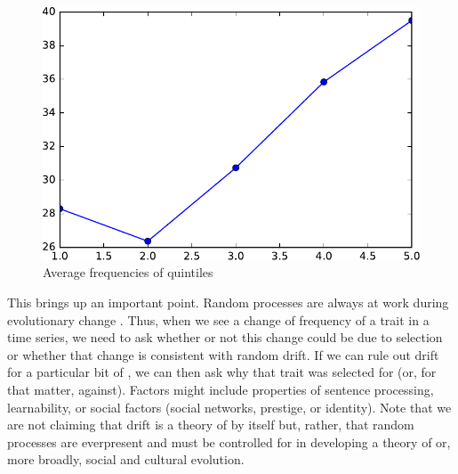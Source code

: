 \documentclass[output=paper]{langsci/langscibook}
\begin{document}
\begin{figure}
  \includegraphics[width=.75\linewidth]{img/smooth_data.pdf}
  \caption{Average frequencies of quintiles\label{smoothed}}
\end{figure}


This brings up an important point.  Random processes are always at
work during evolutionary change \citep{kimura:1983}.  Thus, when we
see a change of frequency of a trait in a time series, we need to ask
whether or not this change could be due to selection or whether that
change is consistent with random drift.  If we can rule out drift for
a particular bit of , we can then ask why that trait
was selected for (or, for that matter, against).  Factors might
include properties of sentence processing, learnability, or social
factors (social networks, prestige, or identity).  Note that we are
not claiming that drift is a theory of  by itself but,
rather, that random processes are everpresent and must be controlled
for in developing a theory of  or, more broadly, social
and cultural evolution.
\end{document}
